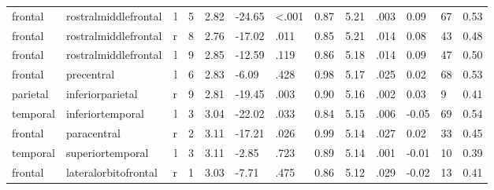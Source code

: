 \documentclass{article}
\begin{document}
\begin{longtable}{llrR{1.3cm}R{1cm}R{1.3cm}R{1cm}R{1cm}R{1.3cm}R{1cm}R{1.8cm}R{1.3cm}R{1.8cm}}
   frontal &      rostralmiddlefrontal &    l &         5 &                  2.82 &           -24.65 &      \textless.001 &                               0.87 &                          5.21 &                            .003 &   0.09 &     67 &      0.53 \\
   frontal &      rostralmiddlefrontal &    r &         8 &                  2.76 &           -17.02 &               .011 &                               0.85 &                          5.21 &                            .014 &   0.08 &     43 &      0.48 \\
   frontal &      rostralmiddlefrontal &    l &         9 &                  2.85 &           -12.59 &               .119 &                               0.86 &                          5.18 &                            .014 &   0.09 &     47 &      0.50 \\
   frontal &                precentral &    l &         6 &                  2.83 &            -6.09 &               .428 &                               0.98 &                          5.17 &                            .025 &   0.02 &     68 &      0.53 \\
  parietal &          inferiorparietal &    r &         9 &                  2.81 &           -19.45 &               .003 &                               0.90 &                          5.16 &                            .002 &   0.03 &      9 &      0.41 \\
  temporal &          inferiortemporal &    l &         3 &                  3.04 &           -22.02 &               .033 &                               0.84 &                          5.15 &                            .006 &  -0.05 &     69 &      0.54 \\
   frontal &               paracentral &    r &         2 &                  3.11 &           -17.21 &               .026 &                               0.99 &                          5.14 &                            .027 &   0.02 &     33 &      0.45 \\
  temporal &          superiortemporal &    l &         3 &                  3.11 &            -2.85 &               .723 &                               0.89 &                          5.14 &                            .001 &  -0.01 &     10 &      0.39 \\
   frontal &      lateralorbitofrontal &    r &         1 &                  3.03 &            -7.71 &               .475 &                               0.86 &                          5.12 &                            .029 &  -0.02 &     13 &      0.41 \\

\end{longtable}
\end{document}
